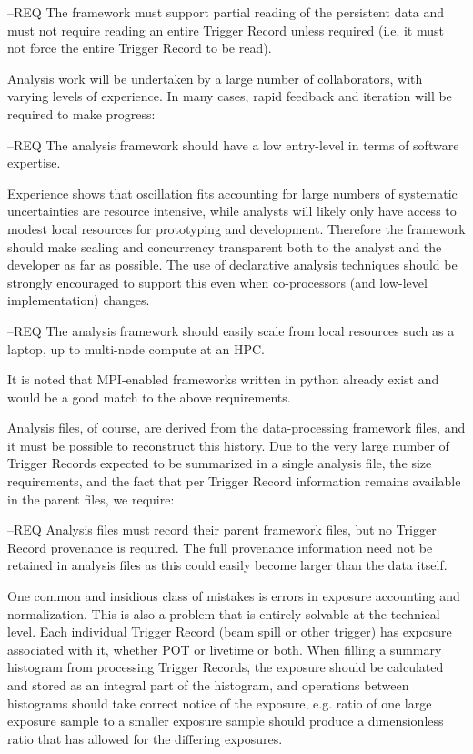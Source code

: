 \documentclass[../main-v1.tex]{subfiles}
\begin{document}
--REQ The framework must support partial reading of the persistent data and must not require reading an entire Trigger Record unless required (i.e. it must not force the entire Trigger Record to be read).


Analysis work will be undertaken by a large number of collaborators, with varying levels of experience. In many cases, rapid feedback and iteration will be required to make progress:

--REQ The analysis framework should have a low entry-level in terms of software expertise.

Experience shows that oscillation fits accounting for large numbers of systematic uncertainties are resource intensive, while analysts will likely only have access to modest local resources for prototyping and development.  Therefore the framework should make scaling and concurrency transparent both to the analyst and the developer as far as possible.  The use of declarative analysis techniques should be strongly encouraged to support this even when co-processors (and low-level implementation) changes.

--REQ The analysis framework should easily scale from local resources such as a laptop, up to multi-node compute at an HPC.

It is noted that MPI-enabled frameworks written in python already exist and would be a good match to the above requirements.

Analysis files, of course, are derived from the data-processing framework files, and it must be possible to reconstruct this history. Due to the very large number of Trigger Records expected to be summarized in a single analysis file, the size requirements, and the fact that per Trigger Record information remains available in the parent files, we require:

--REQ Analysis files must record their parent framework files, but no Trigger Record provenance is required.  The full provenance information need not be retained in analysis files as this could easily become larger than the data itself.

One common and insidious class of mistakes is errors in exposure accounting and normalization. This is also a problem that is entirely solvable at the technical level.  Each individual Trigger Record (beam spill or other trigger) has exposure associated with it, whether POT or livetime or both. When filling a summary histogram from processing Trigger Records, the exposure should be calculated and stored as an integral part of the histogram, and operations between histograms should take correct notice of the exposure, e.g. ratio of one large exposure sample to a smaller exposure sample should produce a dimensionless ratio that has allowed for the differing exposures.
\end{document}
